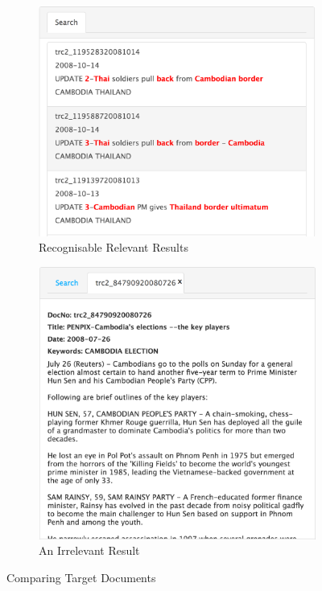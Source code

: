 \documentclass{l4proj}
\begin{document}
\begin{figure}[H]
\centering
\begin{subfigure}{.5\textwidth}
  \centering
  \includegraphics[width=.9\linewidth]{images/good_results}
  \caption{Recognisable Relevant Results}
  \label{relevant_results}
\end{subfigure}%
\begin{subfigure}{.5\textwidth}
  \centering
  \includegraphics[width=.9\linewidth]{images/bad_result}
  \caption{An Irrelevant Result}
  \label{irrelevant_result}
\end{subfigure}
\caption{Comparing Target Documents}
\label{fig:comparingtargetdocs}
\end{figure}
\end{document}
